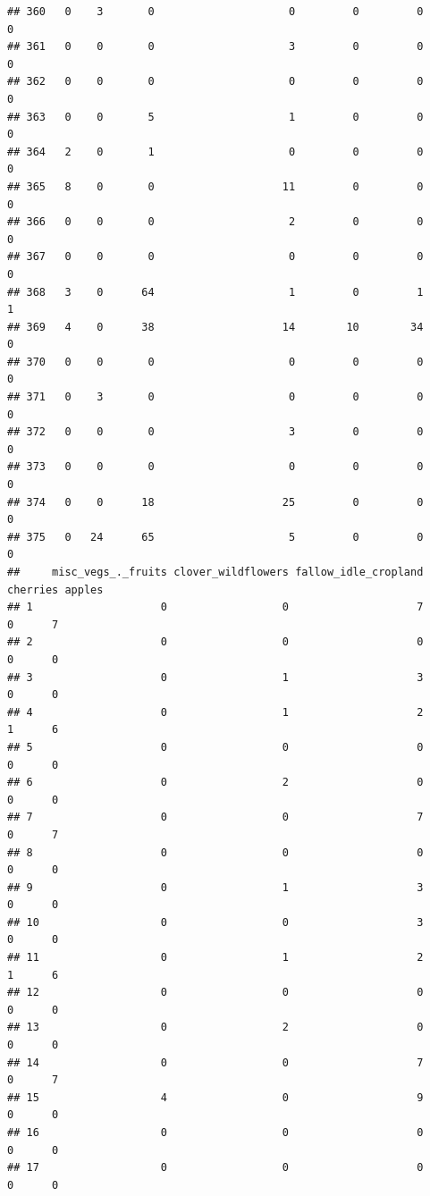 \documentclass[
]{article}
\begin{document}
\begin{verbatim}
## 360   0    3       0                     0         0         0        0
## 361   0    0       0                     3         0         0        0
## 362   0    0       0                     0         0         0        0
## 363   0    0       5                     1         0         0        0
## 364   2    0       1                     0         0         0        0
## 365   8    0       0                    11         0         0        0
## 366   0    0       0                     2         0         0        0
## 367   0    0       0                     0         0         0        0
## 368   3    0      64                     1         0         1        1
## 369   4    0      38                    14        10        34        0
## 370   0    0       0                     0         0         0        0
## 371   0    3       0                     0         0         0        0
## 372   0    0       0                     3         0         0        0
## 373   0    0       0                     0         0         0        0
## 374   0    0      18                    25         0         0        0
## 375   0   24      65                     5         0         0        0
##     misc_vegs_._fruits clover_wildflowers fallow_idle_cropland cherries apples
## 1                    0                  0                    7        0      7
## 2                    0                  0                    0        0      0
## 3                    0                  1                    3        0      0
## 4                    0                  1                    2        1      6
## 5                    0                  0                    0        0      0
## 6                    0                  2                    0        0      0
## 7                    0                  0                    7        0      7
## 8                    0                  0                    0        0      0
## 9                    0                  1                    3        0      0
## 10                   0                  0                    3        0      0
## 11                   0                  1                    2        1      6
## 12                   0                  0                    0        0      0
## 13                   0                  2                    0        0      0
## 14                   0                  0                    7        0      7
## 15                   4                  0                    9        0      0
## 16                   0                  0                    0        0      0
## 17                   0                  0                    0        0      0

\end{verbatim}
\end{document}
